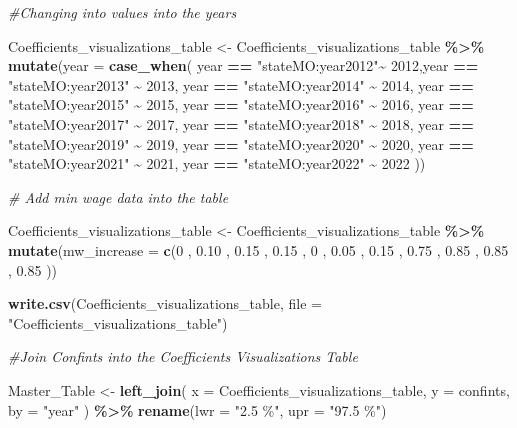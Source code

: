\documentclass[
]{article}
\newenvironment{Shaded}{\begin{snugshade}}{\end{snugshade}}
\newcommand{\AttributeTok}[1]{\textcolor[rgb]{0.13,0.29,0.53}{#1}}
\newcommand{\CommentTok}[1]{\textcolor[rgb]{0.56,0.35,0.01}{\textit{#1}}}
\newcommand{\DecValTok}[1]{\textcolor[rgb]{0.00,0.00,0.81}{#1}}
\newcommand{\FloatTok}[1]{\textcolor[rgb]{0.00,0.00,0.81}{#1}}
\newcommand{\FunctionTok}[1]{\textcolor[rgb]{0.13,0.29,0.53}{\textbf{#1}}}
\newcommand{\NormalTok}[1]{#1}
\newcommand{\OtherTok}[1]{\textcolor[rgb]{0.56,0.35,0.01}{#1}}
\newcommand{\SpecialCharTok}[1]{\textcolor[rgb]{0.81,0.36,0.00}{\textbf{#1}}}
\newcommand{\StringTok}[1]{\textcolor[rgb]{0.31,0.60,0.02}{#1}}
\begin{document}
\begin{Shaded}
\begin{Highlighting}[]
\CommentTok{\#Changing into values into the years}

\NormalTok{Coefficients\_visualizations\_table }\OtherTok{\textless{}{-}}\NormalTok{ Coefficients\_visualizations\_table }\SpecialCharTok{\%\textgreater{}\%}
  \FunctionTok{mutate}\NormalTok{(}\AttributeTok{year =} \FunctionTok{case\_when}\NormalTok{( year }\SpecialCharTok{==} \StringTok{"stateMO:year2012"}\SpecialCharTok{\textasciitilde{}} \DecValTok{2012}\NormalTok{,year }\SpecialCharTok{==} \StringTok{"stateMO:year2013"} \SpecialCharTok{\textasciitilde{}} \DecValTok{2013}\NormalTok{, year }\SpecialCharTok{==} \StringTok{"stateMO:year2014"} \SpecialCharTok{\textasciitilde{}} \DecValTok{2014}\NormalTok{, year }\SpecialCharTok{==} \StringTok{"stateMO:year2015"} \SpecialCharTok{\textasciitilde{}} \DecValTok{2015}\NormalTok{, year }\SpecialCharTok{==} \StringTok{"stateMO:year2016"} \SpecialCharTok{\textasciitilde{}} \DecValTok{2016}\NormalTok{, year }\SpecialCharTok{==} \StringTok{"stateMO:year2017"} \SpecialCharTok{\textasciitilde{}} \DecValTok{2017}\NormalTok{, year }\SpecialCharTok{==} \StringTok{"stateMO:year2018"} \SpecialCharTok{\textasciitilde{}} \DecValTok{2018}\NormalTok{, year }\SpecialCharTok{==} \StringTok{"stateMO:year2019"} \SpecialCharTok{\textasciitilde{}} \DecValTok{2019}\NormalTok{, year }\SpecialCharTok{==} \StringTok{"stateMO:year2020"} \SpecialCharTok{\textasciitilde{}} \DecValTok{2020}\NormalTok{, year }\SpecialCharTok{==} \StringTok{"stateMO:year2021"} \SpecialCharTok{\textasciitilde{}} \DecValTok{2021}\NormalTok{, year }\SpecialCharTok{==} \StringTok{"stateMO:year2022"} \SpecialCharTok{\textasciitilde{}} \DecValTok{2022}
\NormalTok{          ))}

\CommentTok{\# Add min wage data into the table}

\NormalTok{Coefficients\_visualizations\_table }\OtherTok{\textless{}{-}}\NormalTok{ Coefficients\_visualizations\_table }\SpecialCharTok{\%\textgreater{}\%}
  \FunctionTok{mutate}\NormalTok{(}\AttributeTok{mw\_increase =} \FunctionTok{c}\NormalTok{(}\DecValTok{0}\NormalTok{ , }\FloatTok{0.10}\NormalTok{ , }\FloatTok{0.15}\NormalTok{ , }\FloatTok{0.15}\NormalTok{ , }\DecValTok{0}\NormalTok{ , }\FloatTok{0.05}\NormalTok{ , }\FloatTok{0.15}\NormalTok{ , }\FloatTok{0.75}\NormalTok{ , }\FloatTok{0.85}\NormalTok{ , }\FloatTok{0.85}\NormalTok{ , }\FloatTok{0.85}\NormalTok{ ))}

\FunctionTok{write.csv}\NormalTok{(Coefficients\_visualizations\_table, }\AttributeTok{file =} \StringTok{"Coefficients\_visualizations\_table"}\NormalTok{)}

\CommentTok{\#Join Confints into the Coefficients Visualizations Table}

\NormalTok{Master\_Table }\OtherTok{\textless{}{-}} \FunctionTok{left\_join}\NormalTok{(}
\AttributeTok{x =}\NormalTok{ Coefficients\_visualizations\_table, }
\AttributeTok{y =}\NormalTok{ confints, }
\AttributeTok{by =} \StringTok{"year"}
\NormalTok{) }\SpecialCharTok{\%\textgreater{}\%}
  \FunctionTok{rename}\NormalTok{(}\AttributeTok{lwr =} \StringTok{"2.5 \%"}\NormalTok{, }\AttributeTok{upr =} \StringTok{"97.5 \%"}\NormalTok{)}
\end{Highlighting}
\end{Shaded}
\end{document}
